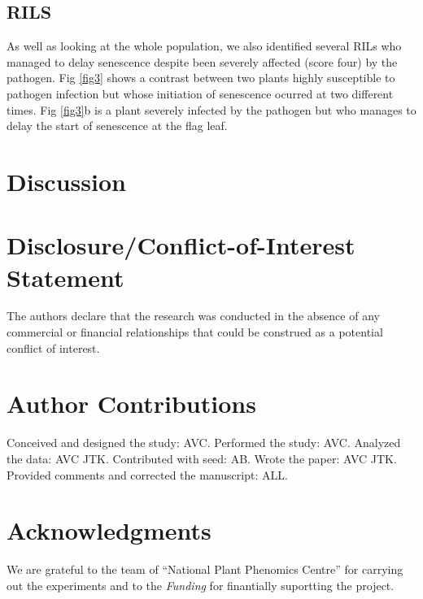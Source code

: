 \documentclass{frontiersSCNS} %
\begin{document}
\subsection{RILS}

As well as looking at the whole population, we also identified several RILs who managed to delay senescence despite been severely affected (score four) by the pathogen. Fig \ref{fig3} shows a contrast between two plants highly susceptible to pathogen infection but whose initiation of senescence ocurred at two different times. Fig \ref{fig3}b is a plant severely infected by the pathogen but who manages to delay the start of senescence at the flag leaf. 


\section{Discussion}



\section*{Disclosure/Conflict-of-Interest Statement}


The authors declare that the research was conducted in the absence of any commercial or financial relationships that could be construed as a potential conflict of interest.

\section*{Author Contributions}

Conceived and designed the study: AVC. Performed the study: AVC. Analyzed the data: AVC JTK. Contributed with seed: AB. Wrote the paper: AVC JTK. Provided comments and corrected the manuscript: ALL.

\section*{Acknowledgments}
 We are grateful to the team of “National Plant Phenomics Centre” for carrying out the experiments and to the 
\textit{Funding\textcolon} for finantially suportting the project.




\end{document}
